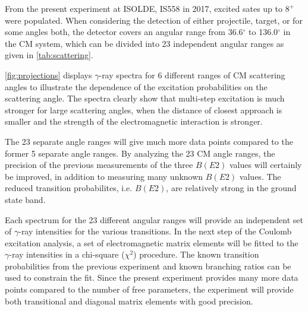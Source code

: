 \documentclass[twoside,english]{uiofysmaster/uiofysmaster}
\newcommand{\ga}{$\gamma$}
\let\orgautoref\autoref
\renewcommand{\autoref}
        {%
		 \def\sectionautorefname{Section}%
		 \def\subsectionautorefname{Section}%
		 \def\subsubsectionautorefname{Section}%
		 \def\chapterautorefname{Chapter}%
          \orgautoref}
\begin{document}
From the present experiment at ISOLDE, IS558 in 2017, excited sates up to $8^+$ were populated. 
When considering the detection of either projectile, target, or for some angles both, the detector covers an angular range from 36.6$^\circ$ to 136.0$^\circ$ in the CM system, which can be divided into 23 independent angular ranges as given in \autoref{tab:scattering}. 

\autoref{fig:projections} displays \ga-ray spectra for 6 different ranges of CM scattering angles to illustrate the dependence of the excitation probabilities on the scattering angle. 
The spectra clearly show that multi-step excitation is much stronger for large scattering angles, when the distance of closest approach is smaller and the strength of the electromagnetic interaction is stronger. 

The 23 separate angle ranges will give much more data points compared to the former 5 separate angle ranges.
By analyzing the 23 CM angle ranges, the precision of the previous measurements of the three $B(E2)$ values will certainly be improved, in addition to measuring many unknown $B(E2)$ values.
The reduced transition probabilites, i.e. $B(E2)$, are relatively strong in the ground state band. 

Each spectrum for the 23 different angular ranges will provide an independent set of \ga-ray intensities for the various transitions. 
In the next step of the Coulomb excitation analysis, a set of electromagnetic matrix elements will be fitted to the \ga-ray intensities in a chi-square ($\chi^2$) procedure. 
The known transition probabilities from the previous experiment and known branching ratios can be used to constrain the fit. 
Since the present experiment provides many more data points compared to the number of free parameters, the experiment will provide both transitional and diagonal matrix elements with good precision. 
\end{document}
